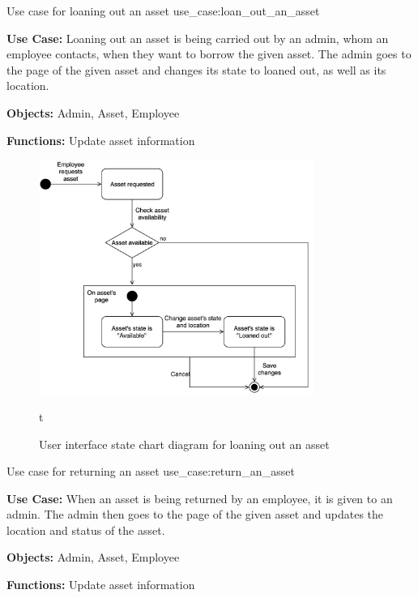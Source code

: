 \newpage

    {Use case for loaning out an asset}
    {use_case:loan_out_an_asset}
    {
        \textbf{Use Case:} Loaning out an asset is being carried out by an admin, whom an employee contacts, when they want to borrow the given asset. The admin goes to the page of the given asset and changes its state to loaned out, as well as its location.
    
        \vskip 0.2cm
        
        \textbf{Objects:} Admin, Asset, Employee
        
        \vskip 0.2cm
        
        \textbf{Functions:} Update asset information
    }
 
\begin{figure}[H]
    \centering
    \includegraphics[width=0.8\textwidth]{figures/UC_Loan_out_asset.png}
    \caption{User interface state chart diagram for loaning out an asset}
    \label{fig:loan_out_asse_statechart}
t\end{figure}
 
 \newpage
 
    {Use case for returning an asset}
    {use_case:return_an_asset}
    {
        \textbf{Use Case:} When an asset is being returned by an employee, it is given to an admin. The admin then goes to the page of the given asset and updates the location and status of the asset.
    
        \vskip 0.2cm
        
        \textbf{Objects:} Admin, Asset, Employee
        
        \vskip 0.2cm
        
        \textbf{Functions:} Update asset information
    }
    
